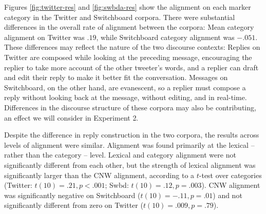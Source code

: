 \documentclass[11pt]{article}
\begin{document}
%
%

Figures \ref{fig:twitter-res} and \ref{fig:swbda-res} show the alignment on each marker category in the Twitter and Switchboard corpora. There were substantial differences in the overall rate of alignment between the corpora: Mean category alignment on Twitter was $.19$, while Switchboard category alignment was $-.051$. These differences may reflect the nature of the two discourse contexts: Replies on Twitter are composed while looking at the preceding message, encouraging the replier to take more account of the other tweeter's words, and a replier can draft and edit their reply to make it better fit the conversation.  Messages on Switchboard, on the other hand, are evanescent, so a replier must compose a reply without looking back at the message, without editing, and in real-time. Differences in the discourse structure of these corpora may also be contributing, an effect we will consider in Experiment 2.  %

Despite the difference in reply construction in the two corpora, the results across levels of alignment were similar. Alignment was found primarily at the lexical -- rather than the category -- level. Lexical and category alignment were not significantly different from each other, but the strength of lexical alignment was significantly larger than the CNW alignment, according to a $t$-test over categories (Twitter: $t(10)=.21, p<.001$; Swbd: $t(10)=.12,p=.003$). CNW alignment was significantly negative on Switchboard ($t(10)=-.11, p=.01$) and not significantly different from zero on Twitter ($t(10)=.009, p=.79$).
\end{document}
